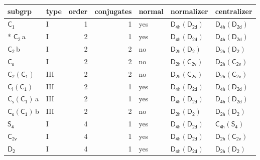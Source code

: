 \documentclass[10pt,a4paper]{article}
\numberwithin{equation}{section}
\newcommand{\grp}[1]{\mathsf{#1}}
\newcommand{\clsletter}[1]{\,{\scriptsize\color{black!55}#1}}
\begin{document}
{\small\begin{longtable}{@{}llrrlll@{}}\toprule
subgrp & type & order & conjugates & normal & normalizer & centralizer\\\midrule\endhead
\bottomrule\endfoot\endlastfoot
\href{../../../rotation/data/pdf/C1.pdf}{$\grp{C_{1}}$} & I & 1 & 1 & yes & \href{D4h-D2d.pdf}{$\grp{D_{4h}}(\grp{D_{2d}})$} & \href{D4h-D2d.pdf}{$\grp{D_{4h}}(\grp{D_{2d}})$}\\*
\href{../../../rotation/data/pdf/C2.pdf}{$\grp{C_{2}}$}\clsletter{a} & I & 2 & 1 & yes & \href{D4h-D2d.pdf}{$\grp{D_{4h}}(\grp{D_{2d}})$} & \href{D4h-D2d.pdf}{$\grp{D_{4h}}(\grp{D_{2d}})$}\\
\href{../../../rotation/data/pdf/C2.pdf}{$\grp{C_{2}}$}\clsletter{b} & I & 2 & 2 & no & \href{D2h-D2.pdf}{$\grp{D_{2h}}(\grp{D_{2}})$} & \href{D2h-D2.pdf}{$\grp{D_{2h}}(\grp{D_{2}})$}\\
\href{../../../rotation/data/pdf/C1v.pdf}{$\grp{C_{s}}$} & I & 2 & 2 & no & \href{D2h-C2v.pdf}{$\grp{D_{2h}}(\grp{C_{2v}})$} & \href{D2h-C2v.pdf}{$\grp{D_{2h}}(\grp{C_{2v}})$}\\
\href{C2-C1.pdf}{$\grp{C_{2}}(\grp{C_{1}})$} & III & 2 & 2 & no & \href{D2h-C2v.pdf}{$\grp{D_{2h}}(\grp{C_{2v}})$} & \href{D2h-C2v.pdf}{$\grp{D_{2h}}(\grp{C_{2v}})$}\\
\href{S2-C1.pdf}{$\grp{C_{i}}(\grp{C_{1}})$} & III & 2 & 1 & yes & \href{D4h-D2d.pdf}{$\grp{D_{4h}}(\grp{D_{2d}})$} & \href{D4h-D2d.pdf}{$\grp{D_{4h}}(\grp{D_{2d}})$}\\
\href{C1v-C1.pdf}{$\grp{C_{s}}(\grp{C_{1}})$}\clsletter{a} & III & 2 & 1 & yes & \href{D4h-D2d.pdf}{$\grp{D_{4h}}(\grp{D_{2d}})$} & \href{D4h-D2d.pdf}{$\grp{D_{4h}}(\grp{D_{2d}})$}\\
\href{C1v-C1.pdf}{$\grp{C_{s}}(\grp{C_{1}})$}\clsletter{b} & III & 2 & 2 & no & \href{D2h-D2.pdf}{$\grp{D_{2h}}(\grp{D_{2}})$} & \href{D2h-D2.pdf}{$\grp{D_{2h}}(\grp{D_{2}})$}\\
\href{../../../rotation/data/pdf/S4.pdf}{$\grp{S_{4}}$} & I & 4 & 1 & yes & \href{D4h-D2d.pdf}{$\grp{D_{4h}}(\grp{D_{2d}})$} & \href{C4h-S4.pdf}{$\grp{C_{4h}}(\grp{S_{4}})$}\\
\href{../../../rotation/data/pdf/C2v.pdf}{$\grp{C_{2v}}$} & I & 4 & 1 & yes & \href{D4h-D2d.pdf}{$\grp{D_{4h}}(\grp{D_{2d}})$} & \href{D2h-C2v.pdf}{$\grp{D_{2h}}(\grp{C_{2v}})$}\\
\href{../../../rotation/data/pdf/D2.pdf}{$\grp{D_{2}}$} & I & 4 & 1 & yes & \href{D4h-D2d.pdf}{$\grp{D_{4h}}(\grp{D_{2d}})$} & \href{D2h-D2.pdf}{$\grp{D_{2h}}(\grp{D_{2}})$}\\

\end{longtable}}
\end{document}
